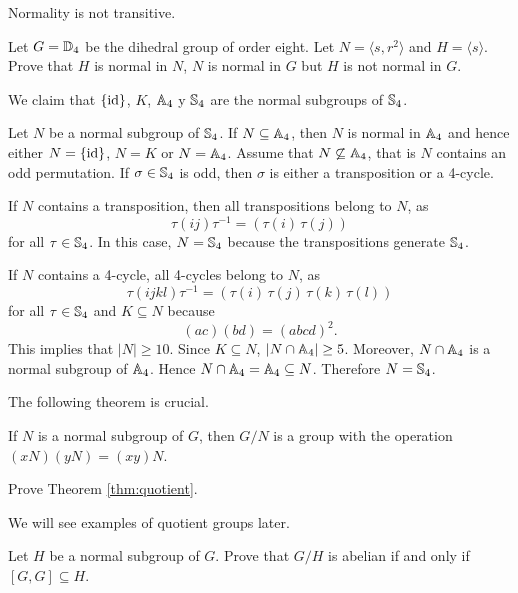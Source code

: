 Normality is not transitive. 

\begin{exercise}
Let $G=\mathbb{D}_4$ be the dihedral group of order eight. Let $N=\langle s,r^2\rangle$ and $H=\langle s\rangle$.
Prove that $H$ is normal in $N$, $N$ is normal in $G$ but $H$ is not normal in $G$. 
\end{exercise}

\begin{example}
We claim that $\{\operatorname{id}\}$, $K$, $\mathbb{A}_4$ y $\mathbb{S}_4$ are the normal subgroups of $\mathbb{S}_4$.

Let $N$ be a normal subgroup of $\mathbb{S}_4$. If $N\subseteq\mathbb{A}_4$, then
$N$ is normal in $\mathbb{A}_4$ and hence either $N=\{\operatorname{id}\}$,
$N=K$ or $N=\mathbb{A}_4$. Assume that $N\not\subseteq\mathbb{A}_4$, that is
$N$ contains an odd permutation. If $\sigma\in\mathbb{S}_4$ is odd, then 
$\sigma$ is either a transposition or a 4-cycle. 
 
If $N$ contains a transposition, then all transpositions 
belong to $N$, as 
\[
\tau(ij)\tau^{-1}=(\tau(i)\,\tau(j))
\]
for all $\tau\in\mathbb{S}_4$. In this case, $N=\mathbb{S}_4$ because 
the transpositions generate $\mathbb{S}_4$. 


If $N$ contains a 4-cycle, all 4-cycles belong to $N$, as 
\[
\tau(ijkl)\tau^{-1}=(\tau(i)\,\tau(j)\,\tau(k)\,\tau(l))
\]
for all $\tau\in\mathbb{S}_4$ and $K\subseteq N$ because 
\[
(ac)(bd)=(abcd)^2.
\]
This implies that $|N|\geq10$. Since $K\subseteq N$,  $|N\cap\mathbb{A}_4|\geq 5$. Moreover, $N\cap\mathbb{A}_4$ is a normal subgroup of $\mathbb{A}_4$.
Hence $N\cap\mathbb{A}_4=\mathbb{A}_4\subseteq N$. Therefore $N=\mathbb{S}_4$.
\end{example}

The following theorem is crucial.

\begin{theorem}
\label{thm:quotient}
If $N$ is a normal subgroup of $G$, then
$G/N$ is a group with the operation 
$(xN)(yN)=(xy)N$.
\end{theorem}

\begin{exercise}
    Prove Theorem \ref{thm:quotient}.   
\end{exercise}


We will see examples of quotient groups later. 

\begin{exercise}
\label{xca:commutator}
Let $H$ be a normal subgroup of $G$. Prove that
$G/H$ is abelian if and only if $[G,G]\subseteq H$.
\end{exercise}

